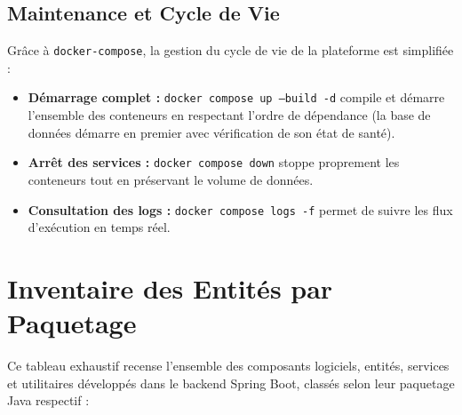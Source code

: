 \documentclass[12pt,a4paper]{article}
\begin{document}
\subsection{Maintenance et Cycle de Vie}
Grâce à \texttt{docker-compose}, la gestion du cycle de vie de la plateforme est simplifiée :
\begin{itemize}
    \item \textbf{Démarrage complet :} \texttt{docker compose up --build -d} compile et démarre l'ensemble des conteneurs en respectant l'ordre de dépendance (la base de données démarre en premier avec vérification de son état de santé).
    \item \textbf{Arrêt des services :} \texttt{docker compose down} stoppe proprement les conteneurs tout en préservant le volume de données.
    \item \textbf{Consultation des logs :} \texttt{docker compose logs -f} permet de suivre les flux d'exécution en temps réel.
\end{itemize}
\clearpage

\appendix
\section{Inventaire des Entités par Paquetage}

Ce tableau exhaustif recense l'ensemble des composants logiciels, entités, services et utilitaires développés dans le backend Spring Boot, classés selon leur paquetage Java respectif :
\end{document}
